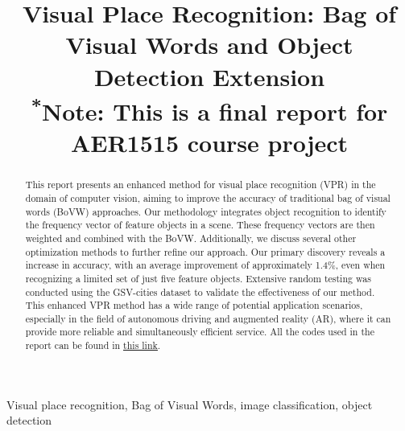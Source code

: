 \documentclass[conference]{IEEEtran}
\begin{document}
\title{Visual Place Recognition: Bag of Visual Words and Object Detection Extension\\
{\footnotesize \textsuperscript{*}Note: This is a final report for AER1515 course project}
}

\author{
\and
{}
}

\maketitle

\begin{abstract}
This report presents an enhanced method for visual place recognition (VPR) in the domain of computer vision, aiming to improve the accuracy of traditional bag of visual words (BoVW) approaches. Our methodology integrates object recognition to identify the frequency vector of feature objects in a scene. These frequency vectors are then weighted and combined with the BoVW. Additionally, we discuss several other optimization methods to further refine our approach. Our primary discovery reveals a increase in accuracy, with an average improvement of approximately 1.4\%, even when recognizing a limited set of just five feature objects. Extensive random testing was conducted using the GSV-cities dataset\cite{ali2022gsv} to validate the effectiveness of our method. This enhanced VPR method has a wide range of potential application scenarios, especially in the field of autonomous driving and augmented reality (AR), where it can provide more reliable and simultaneously efficient service. All the codes used in the report can be found in \underline{\href{https://github.com/ZhentaoFan/AER1515-Rob-Percept/tree/main}{this link}}.
\end{abstract}

\begin{IEEEkeywords}
Visual place recognition, Bag of Visual Words, image classification, object detection
\end{IEEEkeywords}
\end{document}
